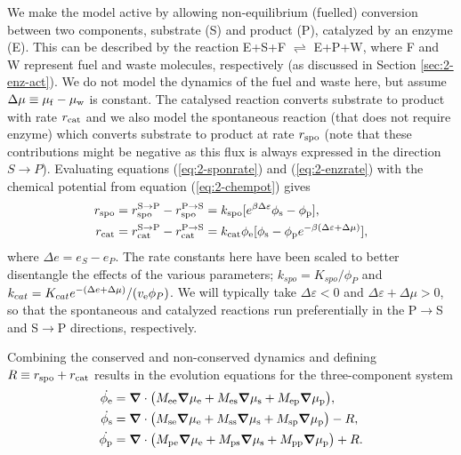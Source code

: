 We make the model active by allowing non-equilibrium (fuelled) conversion between two components, substrate (S) and product (P), catalyzed by an enzyme (E). This can be described by the reaction E+S+F $\rightleftharpoons$ E+P+W, where F and W represent fuel and waste molecules, respectively (as discussed in Section \ref{sec:2-enz-act}). We do not model the dynamics of the fuel and waste here, but assume $\Delta\mu \equiv \mu_{\mathrm{f}}-\mu_{\mathrm{w}}$ is constant. The catalysed reaction converts substrate to product with rate $r_{\mathrm{cat}}$ and we also model the spontaneous reaction (that does not require enzyme) which converts substrate to product at rate $r_{\mathrm{spo}}$ (note that these contributions might be negative as this flux is always expressed in the direction $S \rightarrow P$). Evaluating equations (\ref{eq:2-sponrate}) and (\ref{eq:2-enzrate}) with the chemical potential from equation (\ref{eq:2-chempot}) gives
\begin{align}
    r_{\mathrm{spo}} &= r_{\mathrm{spo}}^{\mathrm{S}\to\mathrm{P}} - r_{\mathrm{spo}}^{\mathrm{P}\to\mathrm{S}} = k_{\mathrm{spo}}[e^{\beta \Delta \varepsilon}\phi_{\mathrm{s}} - \phi_{\mathrm{p}}],
    \label{eq:2-r_spo} \\
    r_{\mathrm{cat}} &= r_{\mathrm{cat}}^{\mathrm{S}\to\mathrm{P}} - r_{\mathrm{cat}}^{\mathrm{P}\to\mathrm{S}} = k_{\mathrm{cat}}\phi_{\mathrm{e}}[\phi_{\mathrm{s}}-\phi_{\mathrm{p}} e^{-\beta(\Delta \varepsilon+ \Delta\mu)}],
    \label{eq:2-r_cat}
\end{align}
where $\Delta e = e_S - e_P$. The rate constants here have been scaled to better disentangle the effects of the various parameters; $k_{spo} = K_{spo}/\phi_P$ and $k_{cat} = K_{cat}e^{-(\Delta e + \Delta \mu)}/(v_{\mathrm{e}} \phi_P)$. We will typically take $\Delta \varepsilon<0$ and $\Delta \varepsilon + \Delta \mu>0$, so that the spontaneous and catalyzed reactions run preferentially in the P$\to$S and S$\to$P directions, respectively.

Combining the conserved and non-conserved dynamics and defining $R\equiv r_{\mathrm{spo}}+r_{\mathrm{cat}}$ results in the evolution equations for the three-component system
\begin{align}
    \dot{\phi_{\mathrm{e}}} &= \bm{\nabla} \cdot \big(M_{\mathrm{ee}}\bm{\nabla}\mu_{\mathrm{e}} + M_{\mathrm{es}}\bm{\nabla}\mu_{\mathrm{s}} + M_{\mathrm{ep}}\bm{\nabla}\mu_{\mathrm{p}}\big), \label{eq:2-evoE}\\
    \dot{\phi_{\mathrm{s}}} &= \bm{\nabla} \cdot \big(M_{\mathrm{se}}\bm{\nabla}\mu_{\mathrm{e}} + M_{\mathrm{ss}}\bm{\nabla}\mu_{\mathrm{s}} + M_{\mathrm{sp}}\bm{\nabla}\mu_{\mathrm{p}}\big) - R, \label{eq:2-evoS}\\
    \dot{\phi_{\mathrm{p}}} &= \bm{\nabla} \cdot \big(M_{\mathrm{pe}}\bm{\nabla}\mu_{\mathrm{e}} + M_{\mathrm{ps}}\bm{\nabla}\mu_{\mathrm{s}} + M_{\mathrm{pp}}\bm{\nabla}\mu_{\mathrm{p}}\big) + R. \label{eq:2-evoP}
\end{align}

